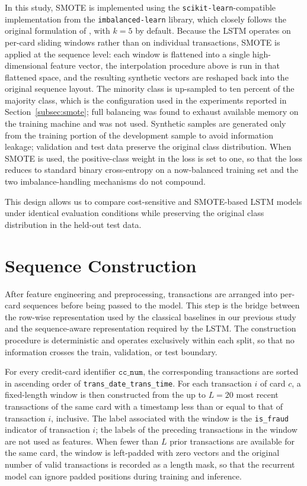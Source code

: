 \documentclass[oneside,12pt,parskip=half,american,numbers=noenddot]{scrreprt}
\begin{document}
In this study, SMOTE is implemented using the \texttt{scikit-learn}-compatible implementation from the \texttt{imbalanced-learn} library, which closely follows the original formulation of \textcite{chawla_smote_2002}, with $k = 5$ by default. Because the LSTM operates on per-card sliding windows rather than on individual transactions, SMOTE is applied at the sequence level: each window is flattened into a single high-dimensional feature vector, the interpolation procedure above is run in that flattened space, and the resulting synthetic vectors are reshaped back into the original sequence layout. The minority class is up-sampled to ten percent of the majority class, which is the configuration used in the experiments reported in Section~\ref{subsec:smote}; full balancing was found to exhaust available memory on the training machine and was not used. Synthetic samples are generated only from the training portion of the development sample to avoid information leakage; validation and test data preserve the original class distribution. When SMOTE is used, the positive-class weight in the loss is set to one, so that the loss reduces to standard binary cross-entropy on a now-balanced training set and the two imbalance-handling mechanisms do not compound.

This design allows us to compare cost-sensitive and SMOTE-based LSTM models under identical evaluation conditions while preserving the original class distribution in the held-out test data.


\section{Sequence Construction}
\label{sec:sequence_construction}

After feature engineering and preprocessing, transactions are arranged into per-card sequences before being passed to the model. This step is the bridge between the row-wise representation used by the classical baselines in our previous study and the sequence-aware representation required by the LSTM. The construction procedure is deterministic and operates exclusively within each split, so that no information crosses the train, validation, or test boundary.

For every credit-card identifier \(\texttt{cc\_num}\), the corresponding transactions are sorted in ascending order of \texttt{trans\_date\_trans\_time}. For each transaction \(i\) of card \(c\), a fixed-length window is then constructed from the up to \(L = 20\) most recent transactions of the same card with a timestamp less than or equal to that of transaction \(i\), inclusive. The label associated with the window is the \texttt{is\_fraud} indicator of transaction \(i\); the labels of the preceding transactions in the window are not used as features. When fewer than \(L\) prior transactions are available for the same card, the window is left-padded with zero vectors and the original number of valid transactions is recorded as a length mask, so that the recurrent model can ignore padded positions during training and inference.
\end{document}
